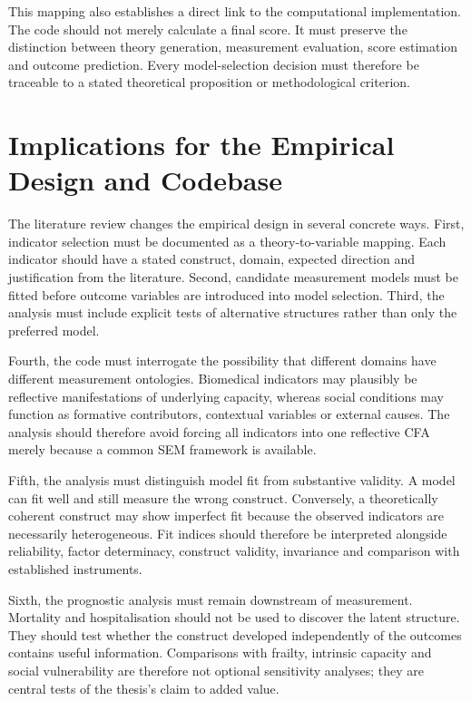This mapping also establishes a direct link to the computational implementation. The code should not merely calculate a final score. It must preserve the distinction between theory generation, measurement evaluation, score estimation and outcome prediction. Every model-selection decision must therefore be traceable to a stated theoretical proposition or methodological criterion.

\section{Implications for the Empirical Design and Codebase}

The literature review changes the empirical design in several concrete ways. First, indicator selection must be documented as a theory-to-variable mapping. Each indicator should have a stated construct, domain, expected direction and justification from the literature. Second, candidate measurement models must be fitted before outcome variables are introduced into model selection. Third, the analysis must include explicit tests of alternative structures rather than only the preferred model.

Fourth, the code must interrogate the possibility that different domains have different measurement ontologies. Biomedical indicators may plausibly be reflective manifestations of underlying capacity, whereas social conditions may function as formative contributors, contextual variables or external causes. The analysis should therefore avoid forcing all indicators into one reflective CFA merely because a common SEM framework is available.

Fifth, the analysis must distinguish model fit from substantive validity. A model can fit well and still measure the wrong construct. Conversely, a theoretically coherent construct may show imperfect fit because the observed indicators are necessarily heterogeneous. Fit indices should therefore be interpreted alongside reliability, factor determinacy, construct validity, invariance and comparison with established instruments.

Sixth, the prognostic analysis must remain downstream of measurement. Mortality and hospitalisation should not be used to discover the latent structure. They should test whether the construct developed independently of the outcomes contains useful information. Comparisons with frailty, intrinsic capacity and social vulnerability are therefore not optional sensitivity analyses; they are central tests of the thesis's claim to added value.

